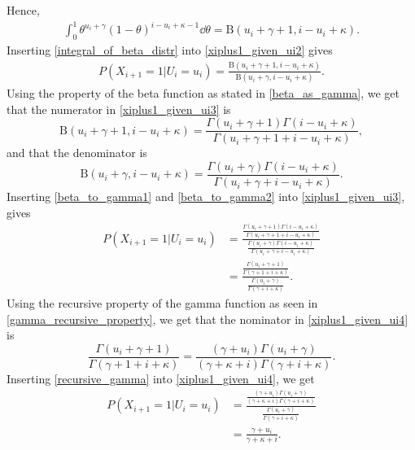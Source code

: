 Hence,
\begin{equation}
\label{integral_of_beta_distr}
    \begin{aligned}
        \int_0^1 \theta^{u_i+\gamma}(1-\theta)^{i-u_i+\kappa-1} \dd \theta = \text{B}(u_i+\gamma+1,i-u_i+\kappa).
    \end{aligned}
\end{equation}
Inserting \eqref{integral_of_beta_distr} into \eqref{xiplus1_given_ui2} gives
\begin{equation}
\label{xiplus1_given_ui3}
    \begin{aligned}
        P(X_{i+1}=1|U_i=u_i) 
        = \frac{\text{B}(u_i+\gamma+1,i-u_i+\kappa)}
        {\text{B}(u_i+\gamma,i-u_i+\kappa)}.
    \end{aligned}
\end{equation}
Using the property of the beta function as stated in \eqref{beta_as_gamma}, we get that the numerator in \eqref{xiplus1_given_ui3} is
\begin{equation}
\label{beta_to_gamma1}
     \text{B}(u_i+\gamma+1,i-u_i+\kappa)
     =\frac{\Gamma(u_i+\gamma+1)\Gamma(i-u_i+\kappa)}{\Gamma(u_i+\gamma+1+i-u_i+\kappa)},
\end{equation}
and that the denominator is
\begin{equation}
\label{beta_to_gamma2}
    \text{B}(u_i+\gamma,i-u_i+\kappa)
    =\frac{\Gamma(u_i+\gamma)\Gamma(i-u_i+\kappa)}{\Gamma(u_i+\gamma+i-u_i+\kappa)}.
\end{equation}
Inserting \eqref{beta_to_gamma1} and \eqref{beta_to_gamma2} into \eqref{xiplus1_given_ui3}, gives
\begin{equation}
\label{xiplus1_given_ui4}
    \begin{aligned}
        P(X_{i+1}=1|U_i=u_i) 
        &= \frac{\frac{\Gamma(u_i+\gamma+1)\Gamma(i-u_i+\kappa)}{\Gamma(u_i+\gamma+1+i-u_i+\kappa)}}
        {\frac{\Gamma(u_i+\gamma)\Gamma(i-u_i+\kappa)}{\Gamma(u_i+\gamma+i-u_i+\kappa)}} \\[6pt]
        &= \frac{\frac{\Gamma(u_i+\gamma+1)}{\Gamma(\gamma+1+i+\kappa)}}
        {\frac{\Gamma(u_i+\gamma)}{\Gamma(\gamma+i+\kappa)}}.
    \end{aligned}
\end{equation}
Using the recursive property of the gamma function as seen in \eqref{gamma_recursive_property}, we get that the nominator in \eqref{xiplus1_given_ui4} is
\begin{equation}
\label{recursive_gamma}
    \frac{\Gamma(u_i+\gamma+1)}{\Gamma(\gamma+1+i+\kappa)}
    =\frac{(\gamma+u_i)\Gamma(u_i+\gamma)}{(\gamma+\kappa+i)\Gamma(\gamma+i+\kappa)}.
\end{equation}
Inserting \eqref{recursive_gamma} into \eqref{xiplus1_given_ui4}, we get
\begin{equation}
\label{xiplus1_given_ui5}
    \begin{aligned}
        P(X_{i+1}=1|U_i=u_i) 
        &= \frac{\frac{(\gamma+u_i)\Gamma(u_i+\gamma)}{(\gamma+\kappa+i)\Gamma(\gamma+i+\kappa)}}
        {\frac{\Gamma(u_i+\gamma)}{\Gamma(\gamma+i+\kappa)}}\\[6pt]
        &=\frac{\gamma+u_i}
        {\gamma+\kappa+i}.
    \end{aligned}
\end{equation}

